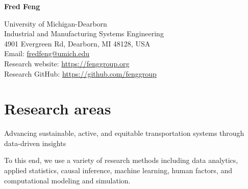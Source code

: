 \documentclass[11pt]{article}
\title{\vspace{-5em}}   %
\author{}
\date{}
\newenvironment{main}
{\begin{adjustwidth}{3em}{}}
{\end{adjustwidth}}
\begin{document}
\maketitle

\begin{multicols}{2}

{\Huge\textbf{Fred Feng}}  %


\hfill\break
\hfill\break
\hfill\break
\hfill\break
\hfill\break

\begin{flushright}
{
University of Michigan-Dearborn\\
Industrial and Manufacturing Systems Engineering\\
4901 Evergreen Rd, Dearborn, MI 48128, USA\\
Email: \href{mailto:fredfeng@umich.edu}{fredfeng@umich.edu}\\
Research website: \url{https://fenggroup.org}\\
Research GitHub: \url{https://github.com/fenggroup}\\
}
\end{flushright}
\end{multicols}

\vspace{-10ex}
\noindent\makebox[\linewidth]{\rule{\textwidth}{0.8pt}}

\section*{Research areas}
\begin{main}


Advancing sustainable, active, and equitable transportation systems through data-driven insights

To this end, we use a variety of research methods including 
data analytics, 
applied statistics, 
causal inference, 
machine learning, 
human factors, 
and computational modeling and simulation.



\end{main}
\end{document}
